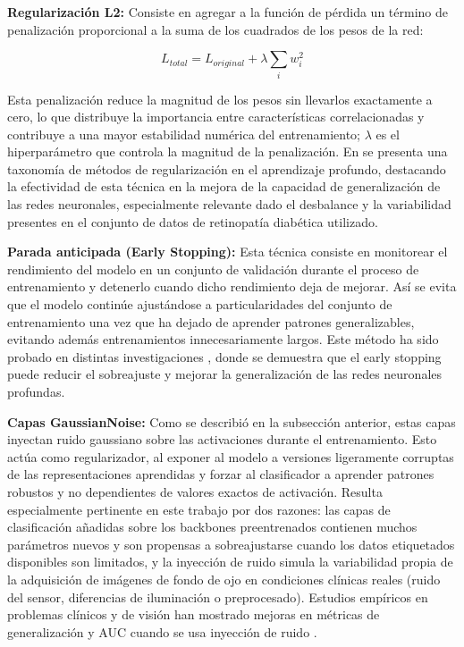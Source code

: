 \textbf{Regularización L2:} Consiste en agregar a la función de pérdida un término de
penalización proporcional a la suma de los cuadrados de los pesos de la red:

\begin{equation}
L_{total} = L_{original} + \lambda \sum_{i} w_i^2
\end{equation}

Esta penalización reduce la magnitud de los pesos sin llevarlos exactamente a cero, lo
que distribuye la importancia entre características correlacionadas y contribuye a una
mayor estabilidad numérica del entrenamiento; $\lambda$ es el hiperparámetro que controla
la magnitud de la penalización. En  se presenta
una taxonomía de métodos de regularización en el aprendizaje profundo, destacando la
efectividad de esta técnica en la mejora de la capacidad de generalización de las redes
neuronales, especialmente relevante dado el desbalance y la variabilidad presentes en el
conjunto de datos de retinopatía diabética utilizado.

\textbf{Parada anticipada (Early Stopping):} Esta técnica consiste en monitorear el
rendimiento del modelo en un conjunto de validación durante el proceso de entrenamiento y
detenerlo cuando dicho rendimiento deja de mejorar. Así se evita que el modelo continúe
ajustándose a particularidades del conjunto de entrenamiento una vez que ha dejado de
aprender patrones generalizables, evitando además entrenamientos innecesariamente largos.
Este método ha sido probado en distintas investigaciones ,
donde se demuestra que el early stopping puede reducir el sobreajuste y mejorar la
generalización de las redes neuronales profundas.

\textbf{Capas GaussianNoise:} Como se describió en la subsección anterior, estas capas
inyectan ruido gaussiano sobre las activaciones durante el entrenamiento. Esto actúa como
regularizador, al exponer al modelo a versiones ligeramente corruptas de las
representaciones aprendidas y forzar al clasificador a aprender patrones robustos y no
dependientes de valores exactos de activación. Resulta especialmente pertinente en este
trabajo por dos razones: las capas de clasificación añadidas sobre los backbones
preentrenados contienen muchos parámetros nuevos y son propensas a sobreajustarse cuando
los datos etiquetados disponibles son limitados, y la inyección de ruido simula la
variabilidad propia de la adquisición de imágenes de fondo de ojo en condiciones clínicas
reales (ruido del sensor, diferencias de iluminación o preprocesado). Estudios empíricos
en problemas clínicos y de visión han mostrado mejoras en métricas de generalización y
AUC cuando se usa inyección de ruido .


